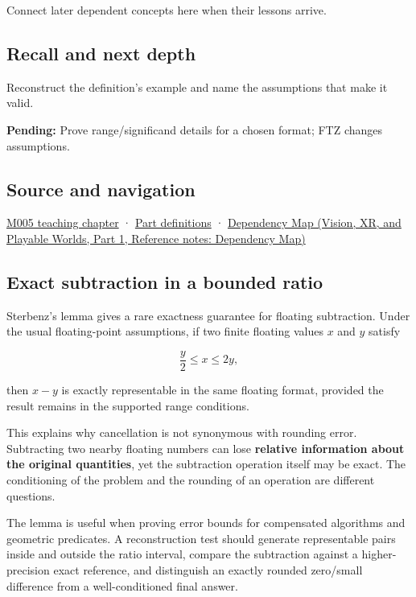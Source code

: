 \hypertarget{appendix-399b7ad53f39-used-by}{}

Connect later dependent concepts here when their lessons arrive.

\subsection{Recall and next depth}\label{appendix-399b7ad53f39-recall-and-next-depth}

\hypertarget{appendix-399b7ad53f39-recall-and-next-depth}{}

Reconstruct the definition's example and name the assumptions that make it valid.

\textbf{Pending:} Prove range/significand details for a chosen format; FTZ changes assumptions.

\subsection{Source and navigation}\label{appendix-399b7ad53f39-source-and-navigation}

\hypertarget{appendix-399b7ad53f39-source-and-navigation}{}

\hyperref[01-foundations-i-ch001-when-arithmetic-meets-uncertainty]{M005 teaching chapter} · \hyperref[appendix-fd090d982a15-m005---parts-77-88]{Part definitions} · \href{../07-Vision-XR-and-Playable-Worlds-P01/main.pdf\#appendix-4ad47bdd269a}{Dependency Map (Vision, XR, and Playable Worlds, Part 1, Reference notes: Dependency Map)}

\subsection{Exact subtraction in a bounded ratio}\label{appendix-399b7ad53f39-exact-subtraction-in-a-bounded-ratio}

\hypertarget{appendix-399b7ad53f39-exact-subtraction-in-a-bounded-ratio}{}

Sterbenz's lemma gives a rare exactness guarantee for floating subtraction. Under the usual floating-point assumptions, if two finite floating values \(x\) and \(y\) satisfy

\[
\frac{y}{2} \le x \le 2y,
\]

then \(x-y\) is exactly representable in the same floating format, provided the result remains in the supported range conditions.

This explains why cancellation is not synonymous with rounding error. Subtracting two nearby floating numbers can lose \textbf{relative information about the original quantities}, yet the subtraction operation itself may be exact. The conditioning of the problem and the rounding of an operation are different questions.

The lemma is useful when proving error bounds for compensated algorithms and geometric predicates. A reconstruction test should generate representable pairs inside and outside the ratio interval, compare the subtraction against a higher-precision exact reference, and distinguish an exactly rounded zero/small difference from a well-conditioned final answer.

